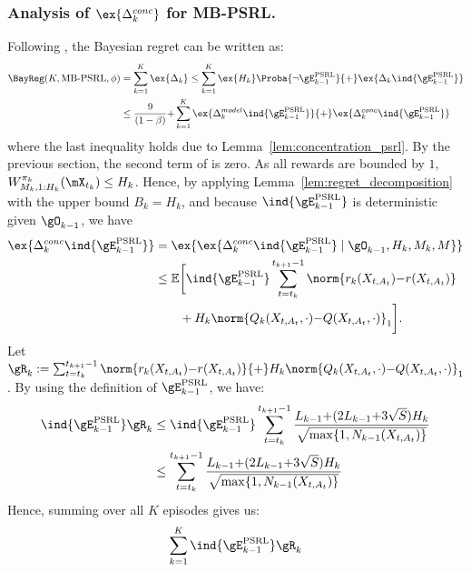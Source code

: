 \begin{subappendices}
\subsubsection{Analysis of $\ex{\Delta^{conc}_k}$ for MB-PSRL.}
Following , the Bayesian regret can be written as:
\begin{align}
    \BayReg(K,\text{MB-PSRL},\phi)
    &= \sum_{k=1}^K \ex{\Delta_k} \le \sum_{k=1}^{K}\ex{H_k}\Proba{\neg \gE^\text{PSRL}_{k-1}} {+}\ex{\Delta_k \ind{\gE^\text{PSRL}_{k-1}}} \nonumber \\
    &\le \frac{9}{(1-\beta)} {+} \sum_{k=1}^{K} \ex{\Delta^{model}_k\ind{\gE^\text{PSRL}_{k-1}}} {+} \ex{\Delta^{conc}_k\ind{\gE^\text{PSRL}_{k-1}}}
    \label{eq:proof_PSRL_regret}
\end{align}
where the last inequality holds due to Lemma~\ref{lem:concentration_psrl}.
By the previous section, the second term of  is zero.
As all rewards are bounded by $1$, $W_{M_k,1:H_k}^{\pi_k}(\mX_{t_k})\le H_k$. Hence, by applying Lemma~\ref{lem:regret_decomposition} with the upper bound $B_k=H_k$, and because $\ind{\gE_{k-1}^\text{PSRL}}$ is deterministic given $\gO_{k-1}$, we have
\begin{align}
    \ex{\Delta_k^{conc} \ind{\gE_{k-1}^\text{PSRL}}}
    &= \ex{\ex{\Delta_k^{conc} \ind{\gE_{k-1}^\text{PSRL}} \mid \gO_{k-1}, H_k, M_k, M}} \nonumber \\
    &\le \mathbb{E}\bigg[ \ind{\gE_{k-1}^\text{PSRL}} \sum_{t=t_k}^{t_{k+1}-1}\norm{r_k(X_{t,A_t}){-}r(X_{t,A_t})} \nonumber\\
    &\qquad +H_k\norm{Q_{k}(X_{t,A_t},\cdot){-}Q(X_{t,A_t},\cdot)}_1 \bigg]. \label{eq:conc_with_i}
\end{align}
Let $\gR_k := \sum_{t=t_k}^{t_{k+1}-1}\norm{r_k(X_{t,A_t}){-}r(X_{t,A_t})} {+}H_k\norm{Q_{k}(X_{t,A_t},\cdot){-}Q(X_{t,A_t},\cdot)}_1$. 
By using the definition of $\gE_{k-1}^\text{PSRL}$, we have:
\begin{align}
    \ind{\gE_{k-1}^\text{PSRL}}\gR_k 
    &\le \ind{\gE_{k-1}^\text{PSRL}} \sum_{t=t_k}^{t_{k+1}-1} \frac{L_{k-1}{+}(2L_{k-1} {+}3\sqrt{S})H_k}{\sqrt{\max\{1,N_{k-1}(X_{t,A_t})\} }} \nonumber\\
    &\le \sum_{t=t_k}^{t_{k+1}-1} \frac{L_{k-1}{+}(2L_{k-1} {+}3\sqrt{S})H_k}{\sqrt{\max\{1,N_{k-1}(X_{t,A_t})\} }} \label{eq:PSRL_R_k}
\end{align}
Hence, summing over all $K$ episodes gives us:
\begin{align}
    \sum_{k=1}^{K} \ind{\gE_{k-1}^\text{PSRL}}\gR_k

\end{align}
\end{subappendices}
